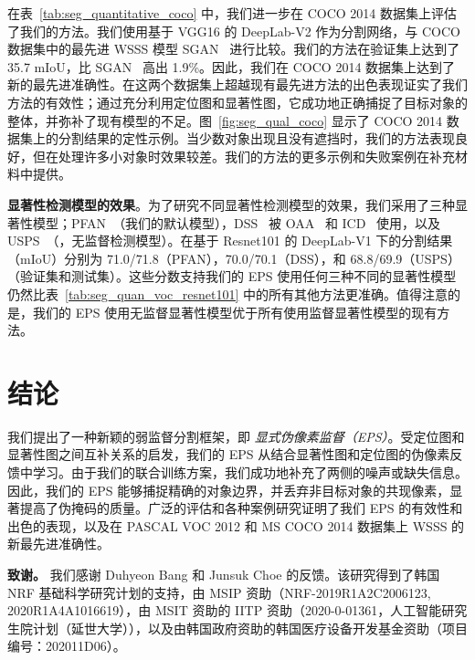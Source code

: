 \documentclass[final]{cvpr}
\begin{document}
在表~\ref{tab:seg_quantitative_coco} 中，我们进一步在 COCO 2014 数据集上评估了我们的方法。我们使用基于 VGG16 的 DeepLab-V2 作为分割网络，与 COCO 数据集中的最先进 WSSS 模型 SGAN~\cite{yao2020saliency} 进行比较。我们的方法在验证集上达到了 35.7 mIoU，比 SGAN~\cite{yao2020saliency} 高出 1.9\%。因此，我们在 COCO 2014 数据集上达到了新的最先进准确性。在这两个数据集上超越现有最先进方法的出色表现证实了我们方法的有效性；通过充分利用定位图和显著性图，它成功地正确捕捉了目标对象的整体，并弥补了现有模型的不足。图~\ref{fig:seg_qual_coco} 显示了 COCO 2014 数据集上的分割结果的定性示例。当少数对象出现且没有遮挡时，我们的方法表现良好，但在处理许多小对象时效果较差。我们的方法的更多示例和失败案例在补充材料中提供。

\vspace{1mm}
\noindent \textbf{显著性检测模型的效果}。为了研究不同显著性检测模型的效果，我们采用了三种显著性模型；PFAN~\cite{zhao2019pyramid}（我们的默认模型），DSS~\cite{hou2017deeply} 被 OAA~\cite{jiang2019integral} 和 ICD~\cite{fan2020learning} 使用，以及 USPS~\cite{nguyen2019deepusps}（\ie，无监督检测模型）。在基于 Resnet101 的 DeepLab-V1 下的分割结果（mIoU）分别为 71.0/71.8（PFAN），70.0/70.1（DSS），和 68.8/69.9（USPS）（验证集和测试集）。这些分数支持我们的 EPS 使用任何三种不同的显著性模型仍然比表~\ref{tab:seg_quan_voc_resnet101} 中的所有其他方法更准确。值得注意的是，我们的 EPS 使用无监督显著性模型优于所有使用监督显著性模型的现有方法。

\section{结论}
我们提出了一种新颖的弱监督分割框架，即 \emph{显式伪像素监督（EPS）}。受定位图和显著性图之间互补关系的启发，我们的 EPS 从结合显著性图和定位图的伪像素反馈中学习。由于我们的联合训练方案，我们成功地补充了两侧的噪声或缺失信息。因此，我们的 EPS 能够捕捉精确的对象边界，并丢弃非目标对象的共现像素，显著提高了伪掩码的质量。广泛的评估和各种案例研究证明了我们 EPS 的有效性和出色的表现，以及在 PASCAL VOC 2012 和 MS COCO 2014 数据集上 WSSS 的新最先进准确性。

\noindent\textbf{致谢。}
我们感谢 Duhyeon Bang 和 Junsuk Choe 的反馈。该研究得到了韩国 NRF 基础科学研究计划的支持，由 MSIP 资助（NRF-2019R1A2C2006123, 2020R1A4A1016619），由 MSIT 资助的 IITP 资助（2020-0-01361，人工智能研究生院计划（延世大学）），以及由韩国政府资助的韩国医疗设备开发基金资助（项目编号：202011D06）。

{\small


}
\end{document}
